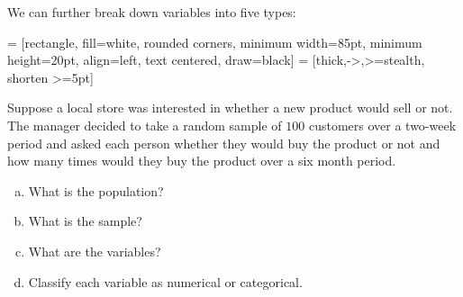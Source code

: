 \documentclass[../mathNotesPreamble]{subfiles}
\begin{document}
  We can further break down variables into five types:
  \begin{center}
     = [rectangle,
      fill=white,
      rounded corners,
      minimum width=85pt,
      minimum height=20pt,
      align=left,
      text centered,
      draw=black]
     = [thick,->,>=stealth, shorten >=5pt]
  \end{center}
  \pagebreak
  \begin{ex*}
    Suppose a local store was interested in whether a new product would sell or not. The manager decided to take a random sample of $100$ customers over a two-week period and asked each person whether they would buy the product or not and how many times would they buy the product over a six month period.
    \begin{enumerate}[a)]
      \item What is the population?
      \item What is the sample?
      \item What are the variables?
      \item Classify each variable as numerical or categorical.
    \end{enumerate}
  \end{ex*}

  \pagebreak
\end{document}
